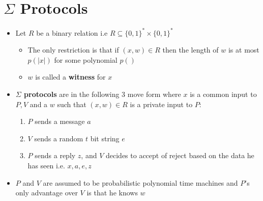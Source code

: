 \section{$\Sigma$ Protocols}
\begin{itemize}
  \item Let $R$ be a binary relation i.e $R \subseteq \{0,1\}^* \times \{0,1\}^*$
  \begin{itemize}
  	\item The only restriction is that if $(x,w) \in R$ then the length of $w$ is at most $p(|x|)$ for some polynomial $p()$
  	\item $w$ is called a \textbf{witness} for $x$
  \end{itemize}
  \item \textbf{$\Sigma$ protocols} are in the following 3 move form where $x$ is a common input to $P,V$ and a $w$ such that $(x,w) \in R$ is a private input to $P$:
  \begin{enumerate}
  	\item $P$ sends a message $a$
  	\item $V$ sends a random $t$ bit string $e$
  	\item $P$ sends a reply $z$, and $V$ decides to accept of reject based on the data he has seen i.e. $x,a,e,z$
  \end{enumerate}
  \item $P$ and $V$ are assumed to be probabilistic polynomial time machines and $P$'s only advantage over $V$ is that he knows $w$ 


\end{itemize}
